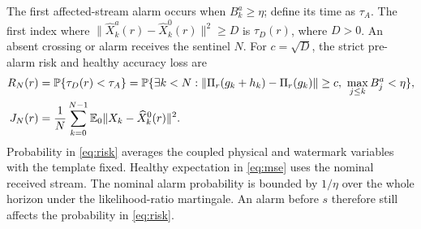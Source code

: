 The first affected-stream alarm occurs when \(B_k^a\ge\eta\); define its time as \(\tau_A\). The first index where \(\|\widehat X_k^a(r)-\widehat X_k^0(r)\|^2\ge D\) is \(\tau_D(r)\), where \(D>0\). An absent crossing or alarm receives the sentinel \(N\). For \(c=\sqrt D\), the strict pre-alarm risk and healthy accuracy loss are
\begin{align}
 R_N(r) &= \mathbb{P}\{\tau_D(r)<\tau_A\}
     = \mathbb{P}\{\exists k<N:\|\Pi_r(g_k+h_k)-\Pi_r(g_k)\|\ge c,\
                         \max_{j\le k}B_j^a<\eta\},\label{eq:risk}\\
 J_N(r) &= \frac1N\sum_{k=0}^{N-1}\mathbb{E}_0\|X_k-\widehat X_k^0(r)\|^2 .
 \label{eq:mse}
\end{align}
Probability in \eqref{eq:risk} averages the coupled physical and watermark variables with the template fixed. Healthy expectation in \eqref{eq:mse} uses the nominal received stream. The nominal alarm probability is bounded by \(1/\eta\) over the whole horizon under the likelihood-ratio martingale. An alarm before \(s\) therefore still affects the probability in \eqref{eq:risk}.
